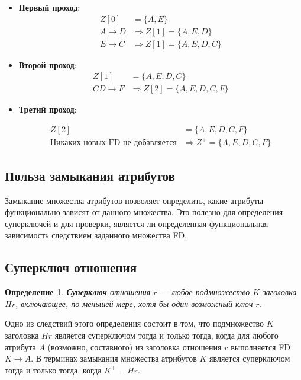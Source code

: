 \documentclass[a4paper,12pt]{article}
\newtheorem{definition}{Определение}
\begin{document}
\begin{itemize}
    \item \textbf{Первый проход}:
    \begin{align*}
        Z[0] &= \{A, E\} \\
        A \rightarrow D &\Rightarrow Z[1] = \{A, E, D\} \\
        E \rightarrow C &\Rightarrow Z[1] = \{A, E, D, C\}
    \end{align*}
    \item \textbf{Второй проход}:
    \begin{align*}
        Z[1] &= \{A, E, D, C\} \\
        CD \rightarrow F &\Rightarrow Z[2] = \{A, E, D, C, F\}
    \end{align*}
    \item \textbf{Третий проход}:

        
   \begin{align*}
    Z[2] &= \{A, E, D, C, F\} \\
    \text{Никаких новых FD не добавляется} &\Rightarrow Z^+ = \{A, E, D, C, F\}
\end{align*}
    
\end{itemize}

\subsection{Польза замыкания атрибутов}

Замыкание множества атрибутов позволяет определить, какие атрибуты функционально зависят от данного множества. Это полезно для определения суперключей и для проверки, является ли определенная функциональная зависимость следствием заданного множества FD.

\subsection{Суперключ отношения}

\begin{definition}
    \textbf{Суперключ} отношения $r$ — любое подмножество $K$ заголовка $Hr$, включающее, по меньшей мере, хотя бы один возможный ключ $r$.
\end{definition}

Одно из следствий этого определения состоит в том, что подмножество $K$ заголовка $Hr$ является суперключом тогда и только тогда, когда для любого атрибута $A$ (возможно, составного) из заголовка отношения $r$ выполняется FD $K \rightarrow A$. В терминах замыкания множества атрибутов $K$ является суперключом тогда и только тогда, когда $K^+ = Hr$.
\end{document}
